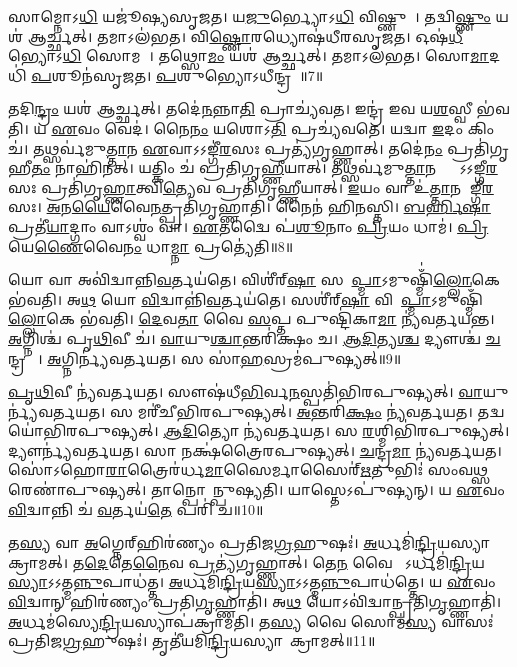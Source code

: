 𑌸𑌾𑌮𑍍𑌨𑍋𑌽\ul{𑌧𑌿} 𑌯𑌜𑍂॑𑌷𑍍𑌯𑌸𑍃𑌜𑌤।
𑌯\ul{𑌜𑍁}𑌰𑍍𑌭𑍍𑌯𑍋𑌽\ul{𑌧𑌿} 𑌵𑌿𑌷𑍍𑌣𑍁𑌮𑍍᳚।
𑌤𑌦𑍍𑌵𑌿\ul{𑌷𑍍𑌣𑍁𑌂} 𑌯𑌶॑ 𑌆𑌰𑍍𑌚𑍍𑌛𑌤𑍍।
𑌤𑌮𑌾𑌽𑌲॑𑌭𑌤।
𑌵𑌿\ul{𑌷𑍍𑌣𑍋}𑌰𑌧𑍍𑌯𑍋𑌷॑𑌧𑍀𑌰𑌸𑍃𑌜𑌤।
𑌓𑌷॑\ul{𑌧𑍀}𑌭𑍍𑌯𑍋𑌽\ul{𑌧𑌿} 𑌸𑍋𑌮𑌮𑍍᳚।
𑌤𑌥𑍍𑌸𑍋\ul{𑌮𑌂} 𑌯𑌶॑ 𑌆𑌰𑍍𑌚𑍍𑌛𑌤𑍍।
𑌤𑌮𑌾𑌽𑌲॑𑌭𑌤।
𑌸𑍋\ul{𑌮𑌾}𑌦𑌧𑌿॑ \ul{𑌪}𑌶𑍂𑌨॑𑌸𑍃𑌜𑌤।
\ul{𑌪}𑌶𑍁𑌭𑍍𑌯𑍋\-𑌽𑌧𑍀𑌨𑍍𑌦𑍍𑌰𑌮𑍍᳚॥7॥

𑌤𑌦𑌿\ul{𑌨𑍍𑌦𑍍𑌰𑌂} 𑌯𑌶॑ 𑌆𑌰𑍍𑌚𑍍𑌛𑌤𑍍।
𑌤𑌦𑍇॑\ul{𑌨}𑌨𑍍𑌨𑌾\ul{𑌤𑌿} 𑌪𑍍𑌰𑌾𑌚𑍍𑌯॑𑌵𑌤।
𑌇𑌨𑍍𑌦𑍍𑌰॑ 𑌇𑌵 𑌯\ul{𑌶}𑌸𑍍𑌵𑍀 𑌭॑𑌵𑌤𑌿।
𑌯 \ul{𑌏}𑌵𑌂 𑌵𑍇𑌦॑।
𑌨𑍈\ul{𑌨𑌂} 𑌯𑌶𑍋𑌽\ul{𑌤𑌿} 𑌪𑍍𑌰𑌚𑍍𑌯॑𑌵𑌤𑍇।
𑌯𑌦𑍍𑌵𑌾 \ul{𑌇}𑌦𑌂 𑌕𑌿𑌂 𑌚॑।
𑌤𑌥𑍍𑌸𑌰𑍍𑌵॑𑌮𑍁\ul{𑌤𑍍𑌤𑌾}𑌨 \ul{𑌏}𑌵𑌾\-𑌽𑌽𑌙𑍍𑌗𑍀॑\ul{𑌰}𑌸𑌃 𑌪𑍍𑌰𑌤𑍍𑌯॑𑌗𑍃𑌹𑍍𑌣𑌾𑌤𑍍।
𑌤𑌦𑍇॑\ul{𑌨𑌂} 𑌪𑍍𑌰𑌤𑌿॑\-𑌗𑍃𑌹𑍀\ul{𑌤𑌂} 𑌨𑌾𑌹𑌿॑𑌨𑌤𑍍।
𑌯𑌤𑍍𑌕𑌿𑌂 𑌚॑ 𑌪𑍍𑌰𑌤𑌿𑌗𑍃\ul{𑌹𑍍𑌣𑍀}𑌯𑌾𑌤𑍍।
𑌤𑌥𑍍𑌸𑌰𑍍𑌵॑𑌮𑍁\ul{𑌤𑍍𑌤𑌾}𑌨𑌸𑍍𑌤𑍍𑌵𑌾᳚\-𑌽𑌽𑌙𑍍𑌗𑍀\ul{𑌰}𑌸𑌃 𑌪𑍍𑌰𑌤𑌿॑\-𑌗𑍃\ul{𑌹𑍍𑌣𑌾}𑌤𑍍𑌵𑌿\ul{𑌤𑍍𑌯𑍇}𑌵 𑌪𑍍𑌰𑌤𑌿॑\-𑌗𑍃𑌹𑍍𑌣𑍀𑌯𑌾𑌤𑍍।
\ul{𑌇}𑌯𑌂 𑌵𑌾 𑌉॑\ul{𑌤𑍍𑌤𑌾}𑌨 𑌆᳚𑌙𑍍𑌗𑍀\ul{𑌰}𑌸𑌃।
\ul{𑌅}𑌨\ul{𑌯𑍈}𑌵𑍈\ul{𑌨}𑌤𑍍𑌪𑍍𑌰𑌤𑌿॑\-𑌗𑍃𑌹𑍍𑌣𑌾𑌤𑌿।
𑌨𑍈𑌨॑ 𑌹𑌿𑌨𑌸𑍍𑌤𑌿।
\ul{𑌬}\ul{𑌰𑍍}𑌹𑌿\ul{𑌷𑌾} 𑌪𑍍𑌰𑌤𑍀॑\ul{𑌯𑌾}𑌦𑍍𑌗𑌾𑌂 𑌵𑌾𑌽𑌶𑍍𑌵𑌂॑ 𑌵𑌾।
\ul{𑌏}𑌤𑌦𑍍𑌵𑍈 𑌪॑\ul{𑌶𑍂}𑌨𑌾𑌂 \ul{𑌪𑍍𑌰𑌿}𑌯𑌂 𑌧𑌾𑌮॑।
\ul{𑌪𑍍𑌰𑌿}𑌯𑍇\ul{𑌣𑍈}𑌵𑍈\ul{𑌨𑌂} 𑌧𑌾\ul{𑌮𑍍𑌨𑌾} 𑌪𑍍𑌰𑌤𑍍𑌯𑍇॑𑌤𑌿॥8॥\anuvakamend[\ul{𑌵𑌿}𑌗𑍍𑌰𑌾𑌹॑\ul{𑌮𑍃}𑌤\ul{𑌵}𑌸𑍍𑌤𑌦𑌾\-𑌽𑌲॑\ul{𑌭}𑌤𑍇𑌨𑍍𑌦𑍍𑌰𑌂॑ 𑌗𑍃𑌹𑍍𑌣𑍀\ul{𑌯𑌾}𑌥𑍍𑌷𑌟𑍍𑌚॑]

𑌯𑍋 𑌵𑌾 𑌅𑌵𑌿॑𑌦𑍍𑌵𑌾𑌨𑍍𑌨𑌿\ul{𑌵}𑌰𑍍𑌤𑌯॑𑌤𑍇।
𑌵𑌿𑌶𑍀॑𑌰𑍍‌\mbox{}\ul{𑌷𑌾} 𑌸𑌪𑌾᳚\ul{𑌪𑍍𑌮𑌾}\-𑌽𑌮𑍁𑌷𑍍𑌮𑌿𑌁॑\ul{𑌲𑍍𑌲𑍋}𑌕𑍇 𑌭॑𑌵𑌤𑌿।
𑌅\ul{𑌥} 𑌯𑍋 \ul{𑌵𑌿}𑌦𑍍𑌵𑌾𑌨𑍍𑌨𑌿॑\ul{𑌵}𑌰𑍍𑌤𑌯॑𑌤𑍇।
𑌸𑌶𑍀॑𑌰𑍍‌\mbox{}\ul{𑌷𑌾} 𑌵𑌿𑌪𑌾᳚\ul{𑌪𑍍𑌮𑌾}\-𑌽𑌮𑍁𑌷𑍍𑌮𑌿𑌁॑\ul{𑌲𑍍𑌲𑍋}𑌕𑍇 𑌭॑𑌵𑌤𑌿।
\ul{𑌦𑍇}𑌵\ul{𑌤𑌾} 𑌵𑍈 \ul{𑌸}𑌪𑍍𑌤 𑌪𑍁𑌷𑍍𑌟𑌿॑𑌕𑌾\ul{𑌮𑌾} 𑌨𑍍𑌯॑𑌵𑌰𑍍𑌤𑌯𑌨𑍍𑌤।
\ul{𑌅}𑌗𑍍𑌨𑌿𑌶𑍍𑌚॑ 𑌪𑍃\ul{𑌥𑌿}𑌵𑍀 𑌚॑।
\ul{𑌵𑌾}𑌯𑍁\ul{𑌶𑍍𑌚𑌾}𑌨𑍍𑌤𑌰𑌿॑𑌕𑍍𑌷𑌂 𑌚।
\ul{𑌆}\ul{𑌦𑌿}𑌤𑍍𑌯\ul{𑌶𑍍𑌚} 𑌦𑍍𑌯𑍗𑌶𑍍𑌚॑ \ul{𑌚}𑌨𑍍𑌦𑍍𑌰𑌮𑌾𑌃᳚।
\ul{𑌅}𑌗𑍍𑌨𑌿𑌰𑍍𑌨𑍍𑌯॑𑌵𑌰𑍍𑌤𑌯𑌤।
𑌸 𑌸𑌾॑\ul{𑌹}𑌸𑍍𑌰𑌮॑𑌪𑍁𑌷𑍍𑌯𑌤𑍍॥9॥

\ul{𑌪𑍃}\ul{𑌥𑌿}𑌵𑍀 𑌨𑍍𑌯॑𑌵𑌰𑍍𑌤𑌯𑌤।
𑌸𑍗𑌷॑𑌧𑍀\ul{𑌭𑌿}𑌰𑍍𑌵\ul{𑌨}𑌸𑍍𑌪𑌤𑌿॑𑌭𑌿𑌰𑌪𑍁𑌷𑍍𑌯𑌤𑍍।
\ul{𑌵𑌾}𑌯𑍁𑌰𑍍𑌨𑍍𑌯॑\-𑌵𑌰𑍍𑌤𑌯𑌤।
𑌸 𑌮𑌰𑍀॑𑌚𑍀𑌭𑌿𑌰𑌪𑍁𑌷𑍍𑌯𑌤𑍍।
\ul{𑌅}𑌨𑍍𑌤𑌰𑌿॑\ul{𑌕𑍍𑌷𑌂} 𑌨𑍍𑌯॑𑌵𑌰𑍍𑌤𑌯𑌤।
𑌤𑌦𑍍𑌵𑌯𑍋॑𑌭𑌿𑌰\-𑌪𑍁𑌷𑍍𑌯𑌤𑍍।
\ul{𑌆}\ul{𑌦𑌿}𑌤𑍍𑌯𑍋 𑌨𑍍𑌯॑𑌵𑌰𑍍𑌤𑌯𑌤।
𑌸 \ul{𑌰}𑌶𑍍𑌮𑌿𑌭𑌿॑𑌰𑌪𑍁𑌷𑍍𑌯𑌤𑍍।
𑌦𑍍𑌯𑍗𑌰𑍍𑌨𑍍𑌯॑\-𑌵𑌰𑍍𑌤𑌯𑌤।
𑌸𑌾 𑌨𑌕𑍍𑌷॑𑌤𑍍𑌰𑍈𑌰𑌪𑍁𑌷𑍍𑌯𑌤𑍍।
\ul{𑌚}𑌨𑍍𑌦𑍍𑌰\ul{𑌮𑌾} 𑌨𑍍𑌯॑𑌵𑌰𑍍𑌤𑌯𑌤।
𑌸𑍋॑𑌽𑌹𑍋\ul{𑌰𑌾}𑌤𑍍𑌰𑍈𑌰॑𑌰𑍍𑌧\-\ul{𑌮𑌾}𑌸𑍈𑌰𑍍𑌮𑌾𑌸𑍈𑌰𑍍॑\ul{𑌋}𑌤𑍁𑌭𑌿𑌃॑ 𑌸𑌂𑌵\ul{𑌥𑍍𑌸}𑌰𑍇𑌣𑌾॑𑌪𑍁𑌷𑍍𑌯𑌤𑍍।
𑌤𑌾𑌨𑍍𑌪𑍋𑌷𑌾᳚𑌨𑍍𑌪𑍁𑌷𑍍𑌯𑌤𑌿।
𑌯𑌾𑌸𑍍𑌤𑍇\-𑌽𑌪𑍁॑𑌷𑍍𑌯𑌨𑍍।
𑌯 \ul{𑌏}𑌵𑌂 \ul{𑌵𑌿}𑌦𑍍𑌵𑌾𑌨𑍍𑌨𑌿 𑌚॑ \ul{𑌵}𑌰𑍍𑌤𑌯॑\ul{𑌤𑍇} 𑌪𑌰𑌿॑ 𑌚॥10॥\anuvakamend[\ul{𑌅}\ul{𑌪𑍁}\ul{𑌷𑍍𑌯}𑌨𑍍𑌨𑌕𑍍𑌷॑𑌤𑍍𑌰𑍈𑌰𑌪𑍁\ul{𑌷𑍍𑌯}𑌤𑍍𑌪𑌞𑍍𑌚॑ 𑌚]

𑌤\ul{𑌸𑍍𑌯} 𑌵𑌾 \ul{𑌅}𑌗𑍍𑌨𑍇𑌰𑍍‌\mbox{}𑌹𑌿𑌰॑𑌣𑍍𑌯𑌂 𑌪𑍍𑌰𑌤𑌿𑌜\ul{𑌗𑍍𑌰}𑌹𑍁𑌷𑌃॑।
\ul{𑌅}𑌰𑍍𑌧𑌮𑌿॑\ul{𑌨𑍍𑌦𑍍𑌰𑌿}𑌯\-𑌸𑍍𑌯𑌾𑌪𑌾᳚\-𑌕𑍍𑌰𑌾𑌮𑌤𑍍।
𑌤\ul{𑌦𑍇}𑌤𑍇\ul{𑌨𑍈}𑌵 𑌪𑍍𑌰𑌤𑍍𑌯॑𑌗𑍃𑌹𑍍𑌣𑌾𑌤𑍍।
𑌤𑍇\ul{𑌨} 𑌵𑍈 𑌸𑍋᳚\-𑌽𑌰𑍍𑌧𑌮𑌿॑\ul{𑌨𑍍𑌦𑍍𑌰𑌿}𑌯\-\ul{𑌸𑍍𑌯𑌾}\-𑌽𑌽𑌤𑍍𑌮\ul{𑌨𑍍𑌨𑍁}𑌪𑌾\-𑌧॑𑌤𑍍𑌤।
\ul{𑌅}𑌰𑍍𑌧𑌮𑌿॑\ul{𑌨𑍍𑌦𑍍𑌰𑌿}𑌯\-\ul{𑌸𑍍𑌯𑌾}\-𑌽𑌽𑌤𑍍𑌮\ul{𑌨𑍍𑌨𑍁}𑌪𑌾\-𑌧॑𑌤𑍍𑌤𑍇।
𑌯 \ul{𑌏}𑌵𑌂 \ul{𑌵𑌿}𑌦𑍍𑌵𑌾𑌨𑍍 𑌹𑌿𑌰॑𑌣𑍍𑌯𑌂 𑌪𑍍𑌰𑌤𑌿\ul{𑌗𑍃}𑌹𑍍𑌣𑌾𑌤𑌿॑।
𑌅\ul{𑌥} 𑌯𑍋𑌽𑌵𑌿॑𑌦𑍍𑌵𑌾𑌨𑍍𑌪𑍍𑌰𑌤𑌿\-\ul{𑌗𑍃}𑌹𑍍𑌣𑌾𑌤𑌿॑।
\ul{𑌅}𑌰𑍍𑌧𑌮॑𑌸𑍍𑌯𑍇\ul{𑌨𑍍𑌦𑍍𑌰𑌿}𑌯\-𑌸𑍍𑌯𑌾𑌪॑\-𑌕𑍍𑌰𑌾𑌮𑌤𑌿।
𑌤\ul{𑌸𑍍𑌯} 𑌵𑍈 𑌸𑍋𑌮॑\ul{𑌸𑍍𑌯} 𑌵𑌾𑌸𑌃॑ 𑌪𑍍𑌰𑌤𑌿𑌜\ul{𑌗𑍍𑌰}𑌹𑍁𑌷𑌃॑।
𑌤𑍃𑌤𑍀॑𑌯𑌮𑌿\ul{𑌨𑍍𑌦𑍍𑌰𑌿}𑌯\-𑌸𑍍𑌯𑌾𑌪𑌾᳚𑌕𑍍𑌰𑌾𑌮𑌤𑍍॥11॥

